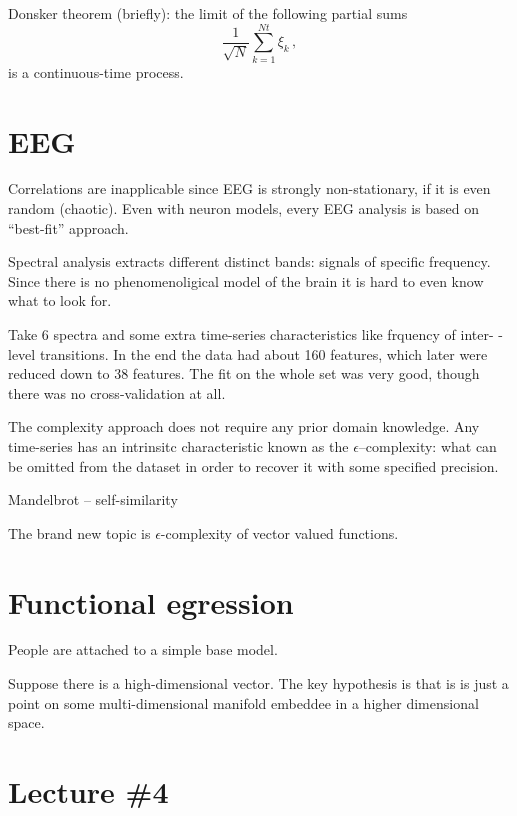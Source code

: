 \documentclass[a4paper]{article}
\begin{document}
Donsker theorem (briefly): the limit of the following partial sums
\[ \frac{1}{\sqrt{N}} \sum_{k=1}^{Nt} \xi_k\,, \]
is a continuous-time process.



\section{EEG} %
\label{sec:eeg}

Correlations are inapplicable since EEG is strongly non-stationary, if it is
even random (chaotic). Even with neuron models, every EEG analysis is based
on ``best-fit'' approach.

Spectral analysis extracts different distinct bands: signals of specific frequency.
Since there is no phenomenoligical model of the brain it is hard to even know what
to look for.

Take 6 spectra and some extra time-series characteristics like frquency of inter-
-level transitions. In the end the data had about 160 features, which later were
reduced down to 38 features. The fit on the whole set was very good, though there
was no cross-validation at all.

The complexity approach does not require any prior domain knowledge. Any time-series
has an intrinsitc characteristic known as the $\epsilon$--complexity: what can be
omitted from the dataset in order to recover it with some specified precision.

Mandelbrot -- self-similarity

The brand new topic is $\epsilon$-complexity of vector valued functions.


\section{Functional egression} %
\label{sec:functional_egression}

People are attached to a simple base model.


Suppose there is a high-dimensional vector. The key hypothesis is that is is just
a point on some multi-dimensional manifold embeddee in a higher dimensional space.

\section{Lecture \#4} %
\label{sec:lecture_4}



\end{document}
